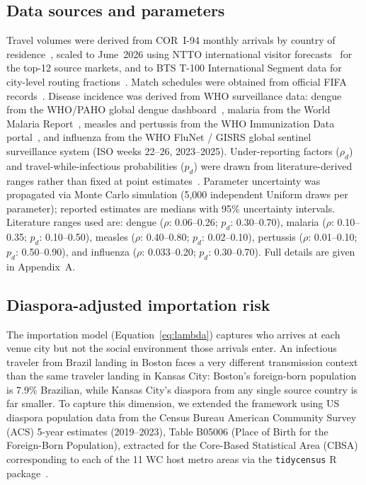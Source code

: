 \documentclass[12pt]{article}
\begin{document}
\subsection*{Data sources and parameters}

Travel volumes were derived from COR~I-94 monthly arrivals by country
of residence~\cite{CBP_I94}, scaled to June~2026 using NTTO
international visitor forecasts~\cite{NTTO2025} for the top-12
source markets, and to BTS T-100 International Segment data for
city-level routing fractions~\cite{BTS_T100}. Match schedules were
obtained from official FIFA records~\cite{FIFA2026_schedule}.
Disease incidence was derived from WHO surveillance data: dengue
from the WHO/PAHO global dengue dashboard~\cite{WHO_dengue},
malaria from the World Malaria Report~\cite{whoWMR2024}, measles
and pertussis from the WHO Immunization Data
portal~\cite{WHO_immunization}, and influenza from the WHO FluNet /
GISRS global sentinel surveillance system (ISO weeks 22--26,
2023--2025). Under-reporting factors ($\rho_d$) and travel-while-infectious
probabilities ($p_d$) were drawn from literature-derived ranges
rather than fixed at point
estimates~\cite{bhatt2013,undurraga2013,whoWMR2024,simons2012,mclaughlin2016}.
Parameter uncertainty was propagated via Monte Carlo simulation
(5,000 independent Uniform draws per parameter); reported estimates
are medians with 95\% uncertainty intervals. Literature ranges used
are: dengue ($\rho$: 0.06--0.26; $p_d$: 0.30--0.70), malaria
($\rho$: 0.10--0.35; $p_d$: 0.10--0.50), measles ($\rho$: 0.40--0.80;
$p_d$: 0.02--0.10), pertussis ($\rho$: 0.01--0.10; $p_d$: 0.50--0.90),
and influenza ($\rho$: 0.033--0.20; $p_d$: 0.30--0.70). Full details
are given in Appendix~A.

\subsection*{Diaspora-adjusted importation risk}

The importation model (Equation~\ref{eq:lambda}) captures who arrives at each
venue city but not the social environment those arrivals enter. An infectious
traveler from Brazil landing in Boston faces a very different transmission
context than the same traveler landing in Kansas City: Boston's foreign-born
population is 7.9\% Brazilian, while Kansas City's diaspora from any single
source country is far smaller. To capture this dimension, we extended the
framework using US diaspora population data from the Census Bureau American
Community Survey (ACS) 5-year estimates (2019--2023), Table B05006 (Place of
Birth for the Foreign-Born Population), extracted for the Core-Based
Statistical Area (CBSA) corresponding to each of the 11 WC host metro areas
via the \texttt{tidycensus} R package~\cite{tidycensus}.
\end{document}
